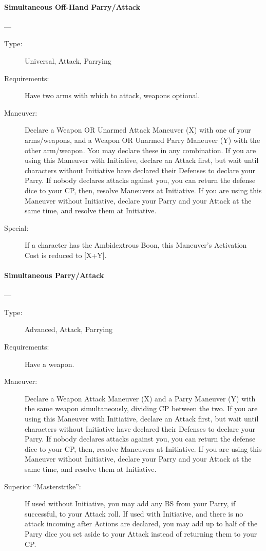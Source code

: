 \documentclass[oneside,11pt,english]{book}
\begin{document}
\paragraph{\large\label{man:Simultaneous Off-Hand Parry/Attack}Simultaneous Off-Hand Parry/Attack}---\quad{\large[X+Y+2]}
\vspace{-10pt}\begin{description} 
\item [Type:] Universal, Attack, Parrying 
\item [Requirements:] Have two arms with which to attack, weapons optional. 
\item [Maneuver:] Declare a Weapon OR Unarmed Attack Maneuver (X) with one of your arms/weapons, and a 
  Weapon OR Unarmed Parry Maneuver (Y) with the other arm/weapon. You may declare these in any 
  combination. 
  If you are using this Maneuver with Initiative, declare an Attack first, but wait until characters without 
  Initiative have declared their Defenses to declare your Parry. If nobody declares attacks against you, you 
  can return the defense dice to your CP, then, resolve Maneuvers at Initiative. 
  If you are using this Maneuver without Initiative, declare your Parry and your Attack at the same time, 
  and resolve them at Initiative. 
\item [Special:] If a character has the Ambidextrous Boon, this Maneuver’s Activation Cost is reduced to [X+Y]. 
\end{description}
\paragraph{\large\label{man:Simultaneous Parry/Attack}Simultaneous Parry/Attack}---\quad{\large[X+Y+2]}
\vspace{-10pt}\begin{description} 
\item [Type:] Advanced, Attack, Parrying 
\item [Requirements:] Have a weapon. 
\item [Maneuver:] Declare a Weapon Attack Maneuver (X) and a Parry Maneuver (Y) with the same weapon 
  simultaneously, dividing CP between the two. 
  If you are using this Maneuver with Initiative, declare an Attack first, but wait until characters without 
  Initiative have declared their Defenses to declare your Parry. If nobody declares attacks against you, you 
  can return the defense dice to your CP, then, resolve Maneuvers at Initiative. 
  If you are using this Maneuver without Initiative, declare your Parry and your Attack at the same time, 
  and resolve them at Initiative. 
\item [Superior “Masterstrike”:] If used without Initiative, you may add any BS from your Parry, if successful, 
  to your Attack roll. If used with Initiative, and there is no attack incoming after Actions are declared, you 
  may add up to half of the Parry dice you set aside to your Attack instead of returning them to your CP. 
\end{description}
\end{document}
